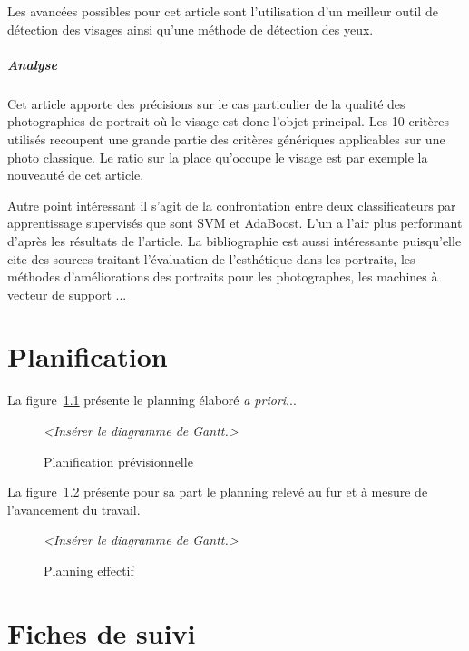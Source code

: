 \documentclass[11pt, french]{report-rd-info}
\begin{document}
Les avancées possibles pour cet article sont l’utilisation d’un meilleur outil de détection des visages ainsi qu’une méthode de détection des yeux.

\paragraph{Analyse}
Cet article apporte des précisions sur le cas particulier de la qualité des photographies de portrait où le visage est donc l’objet principal. Les 10 critères utilisés recoupent une grande partie des critères génériques applicables sur une photo classique. Le ratio sur la place qu’occupe le visage est par exemple la nouveauté de cet article. 

Autre point intéressant il s’agit de la confrontation entre deux classificateurs par apprentissage supervisés que sont SVM et AdaBoost. L’un a l’air plus performant d’après les résultats de l’article. La bibliographie est aussi intéressante puisqu’elle cite des sources traitant l’évaluation de l’esthétique dans les portraits, les méthodes d’améliorations des portraits pour les photographes, les machines à vecteur de support ...


\chapter{Planification}

La figure~\ref{fig:PlanningPrevisionnel} présente le planning élaboré \emph{a priori}...

\begin{figure}
	\centering
		\emph{<Insérer le diagramme de Gantt.>}
	\caption{Planification prévisionnelle}
	\label{fig:PlanningPrevisionnel}
\end{figure}

La figure~\ref{fig:PlanningEffectif} présente pour sa part le planning relevé au fur et à mesure de l'avancement du travail.

\begin{figure}
	\centering
		\emph{<Insérer le diagramme de Gantt.>}
	\caption{Planning effectif}
	\label{fig:PlanningEffectif}
\end{figure}


\chapter{Fiches de suivi}
\label{ann:FichesSuivi}
\end{document}
